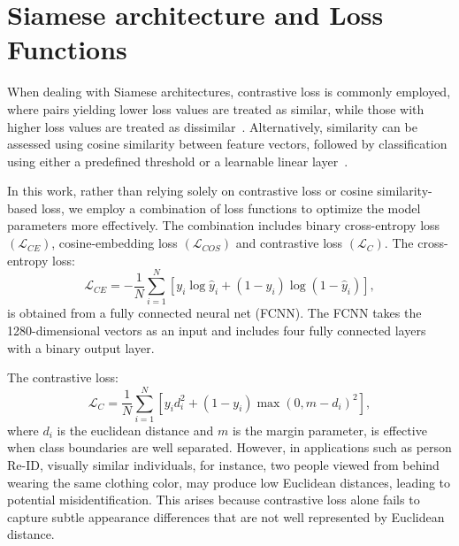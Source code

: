 \documentclass[lettersize,journal]{IEEEtran}
\begin{document}
\section{Siamese architecture and Loss Functions}
\label{sec:arch}
When dealing with Siamese architectures, contrastive loss is commonly employed, where pairs yielding lower loss values are treated as similar, while those with higher loss values are treated as dissimilar~\cite{24, 25, 26}. Alternatively, similarity can be assessed using cosine similarity between feature vectors, followed by classification using either a predefined threshold or a learnable linear layer~\cite{27}.

In this work, rather than relying solely on contrastive loss or cosine similarity-based loss, we employ a combination of loss functions to optimize the model parameters more effectively. The combination includes binary cross-entropy loss $ (\mathcal{L}_{CE}) $, cosine-embedding loss $ (\mathcal{L}_{COS}) $ and contrastive loss $ (\mathcal{L}_{C})$.
The cross-entropy loss:
\begin{equation}
    \mathcal{L}_{CE} = -\frac{1}{N} \sum_{i=1}^{N} \left[ y_i \log \hat{y}_i + (1 - y_i) \log (1 - \hat{y}_i) \right],
    \label{eq:bce_loss}
\end{equation}
is obtained from a fully connected neural net (FCNN). The FCNN takes the 1280-dimensional vectors as an input and includes four fully connected layers with a binary output layer.

The contrastive loss:
\begin{equation}
    \mathcal{L}_{C} = \frac{1}{N} \sum_{i=1}^{N} \left[ y_i d_i^2 + (1 - y_i) \max(0, m - d_i)^2 \right],
    \label{eq:contrastive_loss}
\end{equation}
where $ d_i $ is the euclidean distance and $ m $ is the margin parameter,
is effective when class boundaries are well separated. However, in applications such as person Re-ID, visually similar individuals, for instance, two people viewed from behind wearing the same clothing color, may produce low Euclidean distances, leading to potential misidentification.
This arises because contrastive loss alone fails to capture subtle appearance differences that are not well represented by Euclidean distance.
\end{document}

